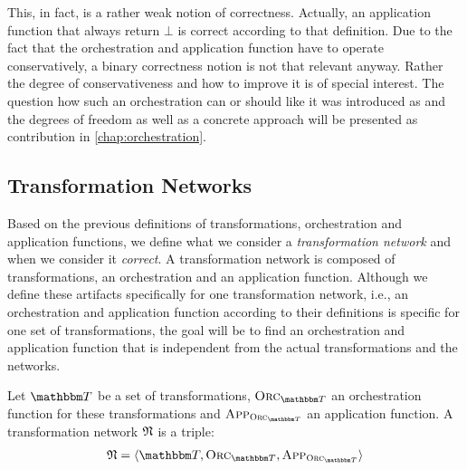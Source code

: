 This, in fact, is a rather weak notion of correctness. 
Actually, an \gls{application function} that always return $\bot$ is correct according to that definition.
Due to the fact that the orchestration and application function have to operate conservatively, a binary correctness notion is not that relevant anyway.
Rather the degree of conservativeness and how to improve it is of special interest.
The question how such an orchestration can or should like it was introduced as  and the degrees of freedom as well as a concrete approach will be presented as contribution  in \autoref{chap:orchestration}.


\subsection{Transformation Networks}

Based on the previous definitions of transformations, orchestration and application functions, we define what we consider a \emph{transformation network} and when we consider it \emph{correct}.
A transformation network is composed of transformations, an orchestration and an application function.
Although we define these artifacts specifically for one transformation network, i.e., an orchestration and application function according to their definitions is specific for one set of transformations, the goal will be to find an orchestration and application function that is independent from the actual transformations and the networks.

\begin{definition}
    \label{def:transformationnetwork}
    Let $\transformationset{T}$ be a set of transformations, $\orcfunction{\transformationset{T}}$ an \gls{orchestration function} for these transformations and $\appfunction{\orcfunction{\transformationset{T}}}$ an \gls{application function}.
    A transformation network $\mathfrak{N}$ is a triple:
    \begin{align*}
        \transformationnetwork{N} = \tupled{\transformationset{T}, \orcfunction{\transformationset{T}}, \appfunction{\orcfunction{\transformationset{T}}}}
    \end{align*}
\end{definition}

